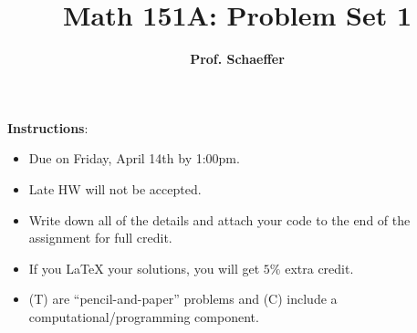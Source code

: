 \documentclass[12pt]{article}
\title{\bf Math 151A: Problem Set 1}
\date{ }
\author{\bf Prof. Schaeffer}
\begin{document}
\maketitle


{\small \textbf{Instructions}:
\begin{itemize}
\item Due on Friday, April 14th by 1:00pm.
\item Late HW will not be accepted.
\item Write down all of the details and attach your code to the end of the assignment for full credit. 
\item If you LaTeX your solutions, you will get $5\%$ extra credit. 
\item (T) are ``pencil-and-paper'' problems and (C) include a computational/programming component. 
\end{itemize}}

\end{document}
